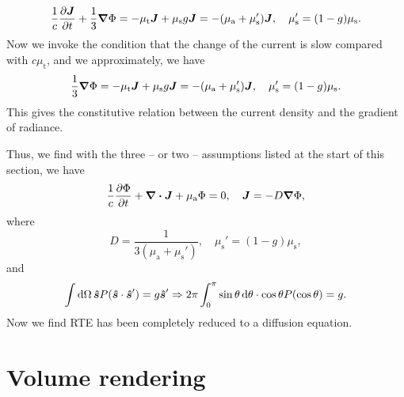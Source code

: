 \documentclass[hyperref, a4paper]{article}
\begin{document}
\begin{equation}
    \frac{1}{c} \pdv{\vb*{J}}{t} + \frac{1}{3} \grad{\Phi}
    = - \mu_{\text{t}} \vb*{J} 
    + \mu_{\text{s}} g \vb*{J}
    = - (\mu_{\text{a}} + \mu_{\text{s}}') \vb*{J}, 
    \quad \mu_{\text{s}}' = (1 - g) \mu_{\text{s}}.
\end{equation}
Now we invoke the condition that the change of the current is slow 
compared with $c \mu_{\text{t}}$, 
and we approximately, we have 
\begin{equation}
    \frac{1}{3} \grad{\Phi}
    = - \mu_{\text{t}} \vb*{J} 
    + \mu_{\text{s}} g \vb*{J}
    = - (\mu_{\text{a}} + \mu_{\text{s}}') \vb*{J}, 
    \quad \mu_{\text{s}}' = (1 - g) \mu_{\text{s}}.
\end{equation}
This gives the constitutive relation between the current density 
and the gradient of radiance. 

Thus, we find with the three -- or two -- assumptions listed at the start of this section, 
we have 
\begin{equation}
    \frac{1}{c} \pdv{\Phi}{t} + \div{\vb*{J}} + \mu_{\text{a}} \Phi = 0, \quad 
    \vb*{J} = - D \grad{\Phi},
    \label{eq:diffusion}
\end{equation}
where 
\begin{equation}
    D = \frac{1}{3 (\mu_{\text{a}} + \mu_{\text{s}}')}, \quad 
    \mu_{\text{s}}' = (1 - g) \mu_{\text{s}}, 
    \label{eq:diffusion-property}
\end{equation}
and 
\begin{equation}
    \int \dd{\Omega} \vu*{s} P(\vu*{s} \cdot \vu*{s}') = g \vu*{s}'
    \Rightarrow 2 \pi \int_{0}^{\pi} \sin \theta \dd{\theta} \cdot \cos \theta P(\cos \theta)
    = g .
\end{equation}
Now we find RTE has been completely reduced to a diffusion equation.

\section{Volume rendering}
\end{document}
